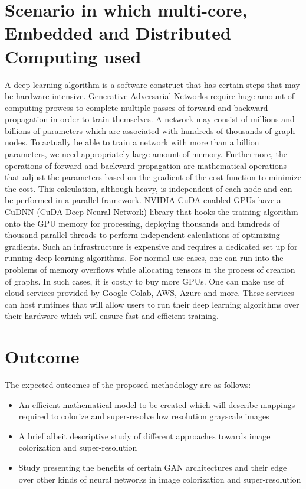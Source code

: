 \documentclass[oneside,a4paper,12pt]{report}
\begin{document}
\section{Scenario in which multi-core, Embedded and Distributed Computing used}
\hspace*{0.25 in}A deep learning algorithm is a software construct that has certain steps that may be hardware intensive. Generative Adversarial Networks require huge amount of computing prowess to complete multiple passes of forward and backward propagation in order to train themselves. A network may consist of millions and billions of parameters which are associated with hundreds of thousands of graph nodes. To actually be able to train a network with more than a billion parameters, we need appropriately large amount of memory. Furthermore, the operations of forward and backward propagation are mathematical operations that adjust the parameters based on the gradient of the cost function to minimize the cost. This calculation, although heavy, is independent of each node and can be performed in a parallel framework. NVIDIA CuDA enabled GPUs have a CuDNN (CuDA Deep Neural Network) library that hooks the training algorithm onto the GPU memory for processing, deploying thousands and hundreds of thousand parallel threads to perform independent calculations of optimizing gradients. Such an infrastructure is expensive and requires a dedicated set up for running deep learning algorithms. For normal use cases, one can run into the problems of memory overflows while allocating tensors in the process of creation of graphs. In such cases, it is costly to buy more GPUs. One can make use of cloud services provided by Google Colab, AWS, Azure and more. These services can host runtimes that will allow users to run their deep learning algorithms over their hardware which will ensure fast and efficient training.


\section{Outcome}
\hspace*{0.25 in}The expected outcomes of the proposed methodology are as follows:
\begin{itemize}
\item An efficient mathematical model to be created which will describe mappings required to colorize and super-resolve low resolution grayscale images
\item A brief albeit descriptive study of different approaches towards image colorization and super-resolution
\item Study presenting the benefits of certain GAN architectures and their edge over other kinds of neural networks in image colorization and super-resolution
\end{itemize}
\end{document}
